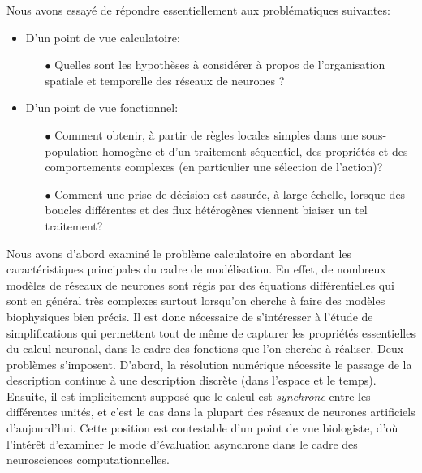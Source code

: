 Nous avons essayé de répondre essentiellement aux problématiques suivantes:
\begin{itemize}
\item D'un point de vue calculatoire: 

\begin{itemize}
\item[$\bullet$]Quelles sont les hypothèses à considérer à propos de l'organisation spatiale et temporelle des réseaux de neurones ?
\end{itemize}
\item D'un point de vue fonctionnel: 
\begin{itemize}
\item[$\bullet$]Comment obtenir, à partir de règles locales simples dans une sous-population homogène et d'un traitement séquentiel, des propriétés et des comportements complexes (en particulier une sélection de l'action)?
\item[$\bullet$]Comment une prise de décision est assurée, à large échelle, lorsque des boucles différentes et des flux hétérogènes viennent biaiser un tel traitement? \\
\end{itemize}
\end{itemize}


Nous avons d'abord examiné le problème calculatoire en abordant les caractéristiques principales du cadre de modélisation. En effet, de nombreux modèles de réseaux de neurones sont régis par des équations différentielles qui sont en général très complexes surtout lorsqu'on cherche à faire des modèles biophysiques bien précis. Il est donc nécessaire de s'intéresser à l'étude de simplifications qui permettent tout de même de capturer les propriétés essentielles du calcul neuronal, dans le cadre des fonctions que l'on cherche à réaliser. Deux problèmes s'imposent. D'abord, la résolution numérique nécessite le passage de la description continue à une description discrète (dans l'espace et le temps). Ensuite, il est implicitement supposé que le calcul est \textit{synchrone} entre les différentes unités, et c'est le cas dans la plupart des réseaux de neurones artificiels d'aujourd'hui. Cette position est contestable d'un point de vue biologiste, d'o\`u l'intérêt d'examiner le mode d'évaluation asynchrone dans le cadre des neurosciences computationnelles.\\%

